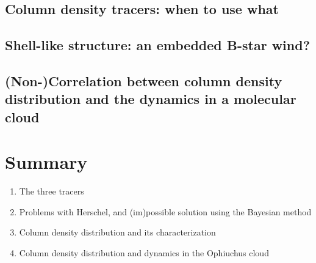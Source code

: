 \documentclass[11pt,a4paper]{emulateapj}
\begin{document}
\subsection{Column density tracers: when to use what}

\subsection{Shell-like structure: an embedded B-star wind?}

\subsection{(Non-)Correlation between column density distribution and the dynamics in a molecular cloud}

\section{Summary}
\label{sec:summary}

\begin{enumerate}
\item The three tracers
\item Problems with Herschel, and (im)possible solution using the Bayesian method
\item Column density distribution and its characterization
\item Column density distribution and dynamics in the Ophiuchus cloud
\end{enumerate}

%



\end{document}
